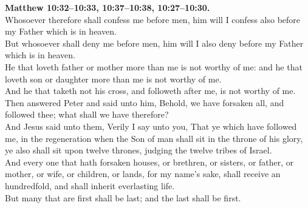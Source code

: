 \documentclass[10pt]{article} %
\begin{document}
{\begin{minipage}[t]{0.45\textwidth}
\textbf{Matthew 10:32--10:33, 10:37--10:38, 10:27--10:30.}\\
Whosoever therefore shall confess me before men, him will I confess also before my Father which is in heaven.\\
But whosoever shall deny me before men, him will I also deny before my Father which is in heaven.\\
He that loveth father or mother more than me is not worthy of me: and he that loveth son or daughter more than me is not worthy of me.\\
And he that taketh not his cross, and followeth after me, is not worthy of me.\\
Then answered Peter and said unto him, Behold, we have forsaken all, and followed thee; what shall we have therefore?\\
And Jesus said unto them, Verily I say unto you, That ye which have followed me, in the regeneration when the Son of man shall sit in the throne of his glory, ye also shall sit upon twelve thrones, judging the twelve tribes of Israel.\\
And every one that hath forsaken houses, or brethren, or sisters, or father, or mother, or wife, or children, or lands, for my name's sake, shall receive an hundredfold, and shall inherit everlasting life.\\
But many that are first shall be last; and the last shall be first.\\
\end{minipage}}
\vspace*{\fill}
\newpage
\huge%
\vspace*{\fill}
\begin{spacing}{1.0}
\end{spacing}
\vspace*{\fill}
\end{document}
